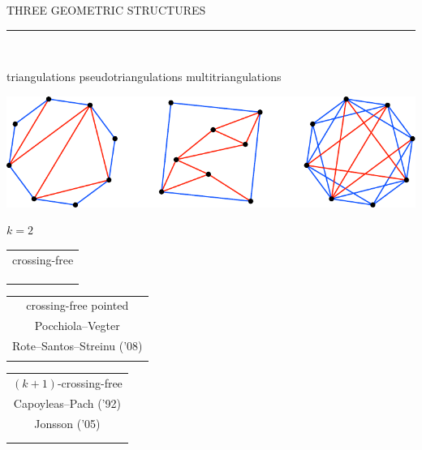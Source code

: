 \documentclass[12pt,titlepage,landscape,a4paper]{article}
\newcommand{\textemoyen}{\fontsize{23}{27}\selectfont}
\newenvironment{slide}[1]
{
\newpage
\begin{center}
{\blue \textemoyen \uppercase{#1}}\\
\end{center}
\vspace{-1cm}
\rule{\textwidth}{0.5 pt}\\
\vspace{-.8cm}
}
{\vspace*{-3cm}}
\newcommand{\violet}{\color{violet}} %
\newcommand{\blue}{\color{blue}} %
\newcommand{\papier}[1]{{\violet\fontsize{15}{20}\selectfont #1}} %
\begin{document}
\begin{slide}{Three geometric structures}

\hspace{1.6cm} triangulations \hspace{3.4cm} pseudotriangulations \hspace{2.5cm} multitriangulations\\
\begin{center}\includegraphics[scale=1.9]{geometricStructures1}\end{center}
\vspace{-1.08cm} \hspace*{25.7cm} ${k=2}$

\hspace{1.7cm} 
\begin{tabular}[t]{c} crossing-free \\ \\[-.3cm] \\ \\  \end{tabular} 
\hspace{3.4cm} 
\begin{tabular}[t]{c} crossing-free pointed \\ \papier{Pocchiola--Vegter} \\[-.3cm] \papier{Rote--Santos--Streinu ('08)} \\ \\  \end{tabular}
\hspace{2cm} 
\begin{tabular}[t]{c} $(k+1)$-crossing-free \\ \papier{Capoyleas--Pach ('92)} \\[-.3cm] \papier{Jonsson ('05)} \\ \\ \\  \end{tabular}

\end{slide}

\end{document}
